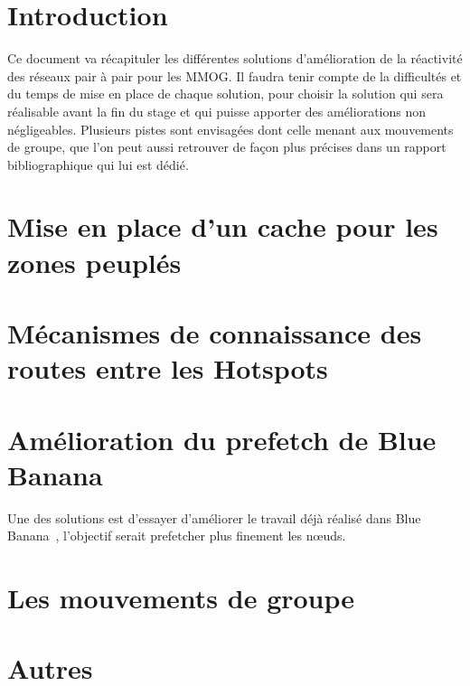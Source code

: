 \documentclass[11pt,a4paper]{article}
\begin{document}

\newpage
\tableofcontents
\newpage



\section{Introduction}
Ce document va récapituler les différentes solutions d'amélioration de la réactivité des réseaux pair à pair pour les MMOG. Il faudra tenir compte de la difficultés et du temps de mise en place de chaque solution, pour choisir la solution qui sera réalisable avant la fin du stage et qui puisse apporter des améliorations non négligeables.
Plusieurs pistes sont envisagées dont celle menant aux mouvements de groupe, que l'on peut aussi retrouver de façon plus précises dans un rapport bibliographique qui lui est dédié.

\section{Mise en place d'un cache pour les zones peuplés}

\section{Mécanismes de connaissance des routes entre les Hotspots}

\section{Amélioration du prefetch de Blue Banana}
Une des solutions est d'essayer d'améliorer le travail déjà réalisé dans Blue Banana~\cite{191}, l'objectif serait prefetcher plus finement les nœuds. 
\section{Les mouvements de groupe}

\section{Autres}



\newpage




 
\end{document}
